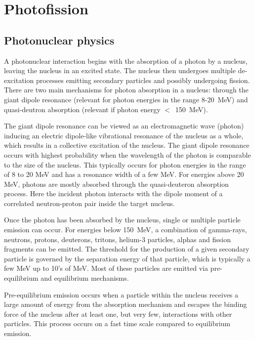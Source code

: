 \section{Photofission}
\subsection{Photonuclear physics}

A photonuclear interaction begins with the absorption of a photon by a nucleus, leaving the nucleus in an excited state. The nucleus then undergoes multiple de-excitation processes emitting secondary particles and possibly undergoing fission. There are two main mechanisms for photon absorption in a nucleus: through the giant dipole resonance (relevant for photon energies in the range 8-20~MeV) and quasi-deutron absorption (relevant if photon energy $<$~150~MeV).  

The giant dipole resonance can be viewed as an electromagnetic wave (photon) inducing an electric dipole-like vibrational resonance of the nucleus as a whole, which results in a collective excitation of the nucleus. The giant dipole resonance occurs with highest probability when the wavelength of the photon is comparable to the size of the nucleus. 
This typically occurs for photon energies in the range of 8 to 20 MeV and has a resonance width of a few MeV. 
For energies above 20 MeV, photons are mostly absorbed through the quasi-deuteron absorption process.
Here the incident photon interacts with the dipole moment of a correlated neutron-proton pair inside the target nucleus. 

Once the photon has been absorbed by the nucleus, single or multiple particle emission can occur. For energies below 150~MeV, a combination of gamma-rays, neutrons, protons, deuterons, tritons, helium-3 particles, alphas and fission fragments can be emitted. The threshold for the production of a given secondary particle is governed by the separation energy of that particle, which is typically a few MeV up to 10's of MeV.  Most of these particles are emitted via pre-equilibrium and equilibrium mechanisms.

Pre-equilibrium emission occurs when a particle within the nucleus receives a large amount of energy from the absorption mechanism and escapes the binding force of the nucleus after at least one, but very few, interactions with other particles. 
This process occurs on a fast time scale compared to equilibrium emission.

